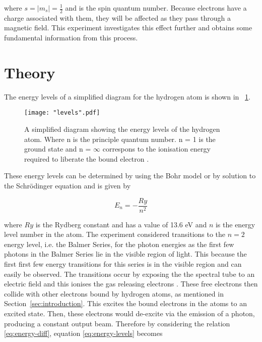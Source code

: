 \documentclass{article}
\newcommand{\figref}[2][\figurename~]{#1\ref{#2}}
\newcommand{\secref}[2][Section~]{#1\ref{#2}}
\begin{document}
\vspace{2mm}
\noindent
where $s = \mid{m_s}\mid = \frac{1}{2}$ and is the spin quantum number. Because electrons have a charge associated with them, they will be affected as they pass through a magnetic field. %
 This experiment investigates this effect further and obtains some fundamental information from this process.

\section{Theory}
\label{sec:theory}

The energy levels of a simplified diagram for the hydrogen atom is shown in \figref{fig:levels}.

\begin{figure}[h]
\centering
\texttt{[image: "levels".pdf]}
\caption{A simplified diagram showing the energy levels of the hydrogen atom. Where n is the principle quantum number. n = 1 is the ground state and n = $\infty$ correspons to the ionisation energy required to liberate the bound electron \cite{Paper01}.}
\label{fig:levels}
\end{figure}

\vspace{2mm}
\noindent
These energy levels can be determined by using the Bohr model or by solution to the Schr\"{o}dinger equation \cite{Paper01} and is given by

\begin{equation}
\label{eq:energy-levels}
E_n = -\frac{Ry}{n^2}
\end{equation}

\vspace{2mm}
\noindent
where $Ry$ is the Rydberg constant and has a value of 13.6 eV \cite{Paper01} and $n$ is the energy level number in the atom. The experiment considered transitions to the $n = 2$ energy level, i.e. the Balmer Series, for the photon energies as the first few photons in the Balmer Series lie in the visible region of light. This because the first first few energy transitions for this series is in the visible region and can easily be observed. The transitions occur by exposing the the spectral tube to an electric field and this ionises the gas releasing electrons \cite{Paper01}. These free electrons then collide with other electrons bound by hydrogen atoms, as mentioned in \secref{sec:introduction}. This excites the bound electrons in the atoms to an excited state. Then, these electrons would de-excite via the emission of a photon, producing a constant output beam. Therefore by considering the relation \eqref{eq:energy-diff}, equation \eqref{eq:energy-levels} becomes
\end{document}

